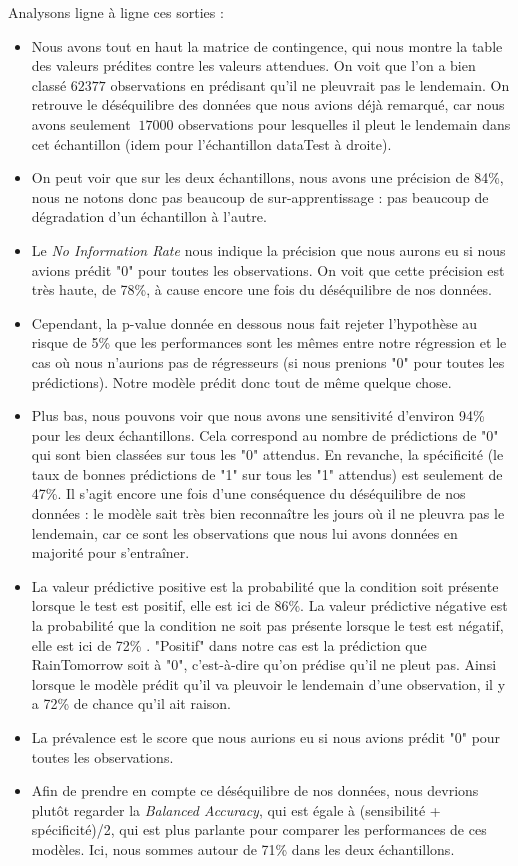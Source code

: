 \documentclass{article}
\begin{document}
Analysons ligne à ligne ces sorties : 
\begin{itemize}
    \item Nous avons tout en haut la matrice de contingence, qui nous montre la table des valeurs prédites contre les valeurs attendues. On voit que l'on a bien classé $62377$ observations en prédisant qu'il ne pleuvrait pas le lendemain. On retrouve le déséquilibre des données que nous avions déjà remarqué, car nous avons seulement $~17000$ observations pour lesquelles il pleut le lendemain dans cet échantillon (idem pour l'échantillon dataTest à droite).
    \item On peut voir que sur les deux échantillons, nous avons une précision de 84\%, nous ne notons donc pas beaucoup de sur-apprentissage : pas beaucoup de dégradation d'un échantillon à l'autre.
    \item Le \emph{No Information Rate} nous indique la précision que nous aurons eu si nous avions prédit "0" pour toutes les observations. On voit que cette précision est très haute, de 78\%, à cause encore une fois du déséquilibre de nos données. 
    \item Cependant, la p-value donnée en dessous nous fait rejeter l'hypothèse au risque de 5\% que les performances sont les mêmes entre notre régression et le cas où nous n'aurions pas de régresseurs (si nous prenions "0" pour toutes les prédictions). Notre modèle prédit donc tout de même quelque chose.
    \item Plus bas, nous pouvons voir que nous avons une sensitivité d'environ 94\% pour les deux échantillons. Cela correspond au nombre de prédictions de "0" qui sont bien classées sur tous les "0" attendus. En revanche, la spécificité (le taux de bonnes prédictions de "1" sur tous les "1" attendus) est seulement de 47\%. Il s'agit encore une fois d'une conséquence du déséquilibre de nos données : le modèle sait très bien reconnaître les jours où il ne pleuvra pas le lendemain, car ce sont les observations que nous lui avons données en majorité pour s'entraîner.
    \item La valeur prédictive positive est la probabilité que la condition soit présente lorsque le test est positif, elle est ici de 86\%. La valeur prédictive négative est la probabilité que la condition ne soit pas présente lorsque le test est négatif, elle est ici de 72\% \cite{frwiki:183891886}. "Positif" dans notre cas est la prédiction que RainTomorrow soit à "0", c'est-à-dire qu'on prédise qu'il ne pleut pas. Ainsi lorsque le modèle prédit qu'il va pleuvoir le lendemain d'une observation, il y a 72\% de chance qu'il ait raison.
    \item La prévalence est le score que nous aurions eu si nous avions prédit "0" pour toutes les observations.
    \item Afin de prendre en compte ce déséquilibre de nos données, nous devrions plutôt regarder la \emph{Balanced Accuracy}, qui est égale à (sensibilité + spécificité)/2, qui est plus parlante pour comparer les performances de ces modèles. Ici, nous sommes autour de 71\% dans les deux échantillons.
\end{itemize}
\end{document}
